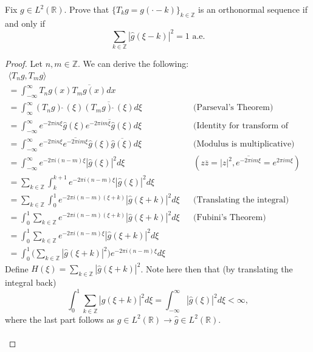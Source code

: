 \documentclass[12pt]{article}
\newenvironment{ex}[2][Exercise]{\begin{trivlist}
\item[\hskip \labelsep {\bfseries #1}\hskip \labelsep {\bfseries #2.}]}{\end{trivlist}}
\begin{document}
\begin{ex}{12}
    Fix $g \in L^2(\mathbb{R})$. Prove that $\{T_kg = g(\cdot - k)\}_{k \in \mathbb{Z}}$ is an orthonormal sequence if and only if 
    $$\sum_{k \in \mathbb{Z}} |\hat{g}(\xi - k)|^2 = 1 \text{ a.e.}$$
    \begin{proof}
        Let $n, m \in \mathbb{Z}$. We can derive the following:
        \begin{align*}
            \langle T_ng, T_mg \rangle \\
            = \int_{-\infty}^\infty T_ng(x)\overline{T_mg(x)}dx \\
            = \int_{\infty}^\infty (T_ng)\hat{\;}(\xi)\overline{(T_mg)\hat{\;}(\xi)} d\xi && \text{(Parseval's Theorem)} \\
            = \int_{-\infty}^\infty e^{-2\pi in\xi}\hat{g}(\xi)\overline{e^{-2\pi im\xi}\hat{g}(\xi)} d\xi && \text{(Identity for transform of translation)} \\
            = \int_{-\infty}^\infty e^{-2\pi in\xi}\overline{e^{-2\pi im\xi}}\hat{g}(\xi)\overline{\hat{g}(\xi)} d\xi && \text{(Modulus is multiplicative)} \\
            = \int_{-\infty}^\infty e^{-2\pi i(n - m)\xi}|\hat{g}(\xi)|^2 d\xi && (z\overline{z} = |z|^2, \overline{e^{-2\pi im\xi}} = e^{2\pi im\xi}) \\
            = \sum_{k \in \mathbb{Z}} \int_{k}^{k + 1} e^{-2\pi i(n - m)\xi}|\hat{g}(\xi)|^2 d\xi \\
            = \sum_{k \in \mathbb{Z}} \int_0^1 e^{{-2\pi i}(n - m)(\xi + k)}|\hat{g}(\xi + k)|^2 d\xi && \text{(Translating the integral)}\\
            = \int_0^1 \sum_{k \in \mathbb{Z}} e^{{-2\pi i}(n - m)(\xi + k)}|\hat{g}(\xi + k)|^2 d\xi && \text{(Fubini's Theorem)} \\
            = \int_0^1 \sum_{k \in \mathbb{Z}} e^{-2\pi i(n - m)\xi}|\hat{g}(\xi + k)|^2 d\xi \\
            = \int_0^1 \Big ( \sum_{k \in \mathbb{Z}} |\hat{g}(\xi + k)|^2 \Big)e^{-2\pi i(n - m)\xi} d\xi
        \end{align*}
        Define $H(\xi) = \sum_{k \in \mathbb{Z}} |\hat{g}(\xi + k)|^2$. Note here then that (by translating the integral back)
        $$\int_0^1 \sum_{k \in \mathbb{Z}} |\hat{g}(\xi + k)|^2  d\xi = \int_{-\infty}^\infty |\hat{g}(\xi)|^2 d\xi < \infty,$$
        where the last part follows as $g \in L^2(\mathbb{R}) \rightarrow \hat{g} \in L^2(\mathbb{R})$. \\ \\ 

\end{proof}
\end{ex}
\end{document}
